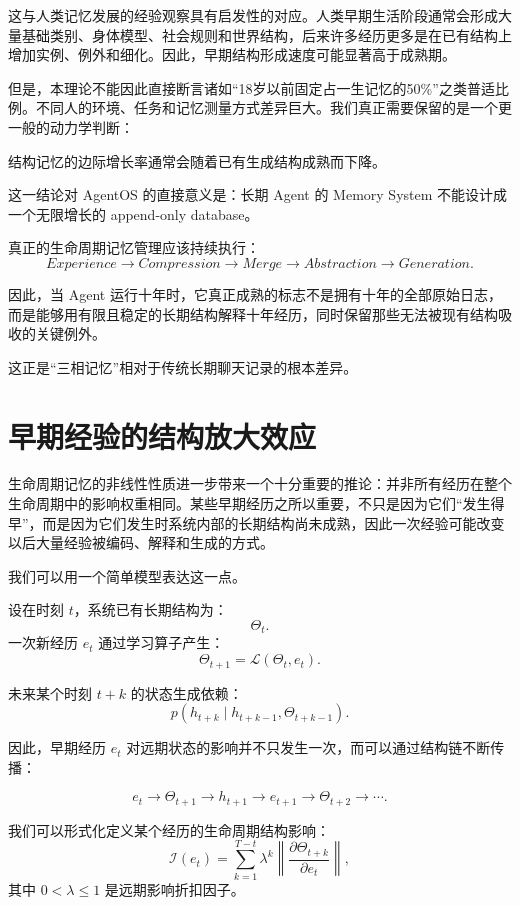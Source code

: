 这与人类记忆发展的经验观察具有启发性的对应。人类早期生活阶段通常会形成大量基础类别、身体模型、社会规则和世界结构，后来许多经历更多是在已有结构上增加实例、例外和细化。因此，早期结构形成速度可能显著高于成熟期。

但是，本理论不能因此直接断言诸如“18岁以前固定占一生记忆的50\%”之类普适比例。不同人的环境、任务和记忆测量方式差异巨大。我们真正需要保留的是一个更一般的动力学判断：

\begin{proposition*}
结构记忆的边际增长率通常会随着已有生成结构成熟而下降。
\end{proposition*}

这一结论对 AgentOS 的直接意义是：长期 Agent 的 Memory System 不能设计成一个无限增长的 append-only database。

真正的生命周期记忆管理应该持续执行：
\[
Experience
\rightarrow
Compression
\rightarrow
Merge
\rightarrow
Abstraction
\rightarrow
Generation.
\]

因此，当 Agent 运行十年时，它真正成熟的标志不是拥有十年的全部原始日志，而是能够用有限且稳定的长期结构解释十年经历，同时保留那些无法被现有结构吸收的关键例外。

这正是“三相记忆”相对于传统长期聊天记录的根本差异。

\section{早期经验的结构放大效应}

生命周期记忆的非线性性质进一步带来一个十分重要的推论：并非所有经历在整个生命周期中的影响权重相同。某些早期经历之所以重要，不只是因为它们“发生得早”，而是因为它们发生时系统内部的长期结构尚未成熟，因此一次经验可能改变以后大量经验被编码、解释和生成的方式。

我们可以用一个简单模型表达这一点。

设在时刻 \(t\)，系统已有长期结构为：
\[
\Theta_t.
\]
一次新经历 \(e_t\) 通过学习算子产生：
\[
\Theta_{t+1}
=
\mathcal L
(\Theta_t,e_t).
\]

未来某个时刻 \(t+k\) 的状态生成依赖：
\[
p(h_{t+k}\mid h_{t+k-1},\Theta_{t+k-1}).
\]

因此，早期经历 \(e_t\) 对远期状态的影响并不只发生一次，而可以通过结构链不断传播：

\[
e_t
\rightarrow
\Theta_{t+1}
\rightarrow
h_{t+1}
\rightarrow
e_{t+1}
\rightarrow
\Theta_{t+2}
\rightarrow
\cdots.
\]

我们可以形式化定义某个经历的生命周期结构影响：
\[
\mathcal I(e_t)
=
\sum_{k=1}^{T-t}
\lambda^k
\left\|
\frac{\partial
\Theta_{t+k}}
{\partial e_t}
\right\|,
\]
其中 \(0<\lambda\le1\) 是远期影响折扣因子。


